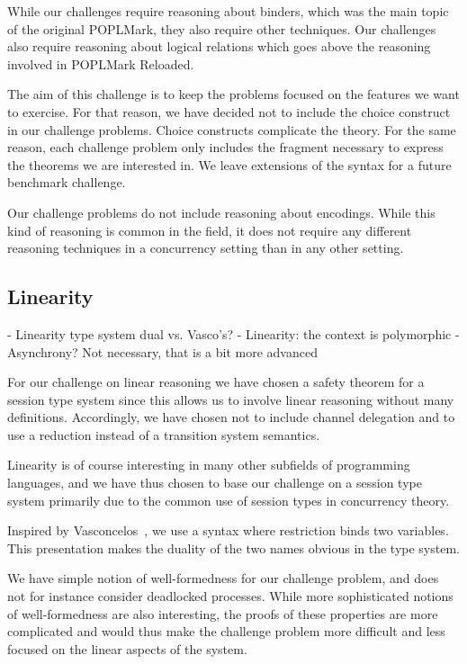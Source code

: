 \documentclass[runningheads]{llncs}
\begin{document}
While our challenges require reasoning about binders, which was the main topic of the original POPLMark, they also require other techniques.
Our challenges also require reasoning about logical relations which goes above the reasoning involved in POPLMark Reloaded.

The aim of this challenge is to keep the problems focused on the
features we want to exercise. For that reason, we have decided not to
include the choice construct in our challenge problems. Choice
constructs complicate the theory. For the same reason, each challenge
problem only includes the fragment necessary to express the theorems
we are interested in. We leave extensions of the syntax for a future
benchmark challenge.

Our challenge problems do not include reasoning about encodings. While
this kind of reasoning is common in the field, it does not require any
different reasoning techniques in a concurrency setting than in any
other setting.

\subsection{Linearity}
- Linearity type system dual vs. Vasco's?
- Linearity: the context is polymorphic
- Asynchrony? Not necessary, that is a bit more advanced

For our challenge on linear reasoning we have chosen a safety theorem
for a session type system since this allows us to involve linear
reasoning without many definitions. Accordingly, we have chosen not to
include channel delegation and to use a reduction instead of a
transition system semantics.

Linearity is of course interesting in many other subfields of programming languages, and we have thus chosen to base our challenge on a  session type system primarily due to the common use of session types in concurrency theory.

Inspired by Vasconcelos~\cite{Vasconcelos2012}, we use a syntax where
restriction binds two variables. This presentation makes the duality
of the two names obvious in the type system.

We have simple notion of well-formedness for our challenge problem,
and does not for instance consider deadlocked processes. While more
sophisticated notions of well-formedness are also interesting, the
proofs of these properties are more complicated and would thus make
the challenge problem more difficult and less focused on the linear
aspects of the system.
\end{document}
